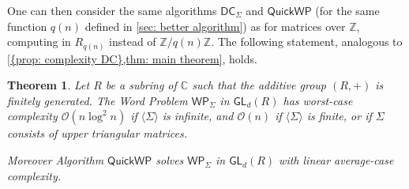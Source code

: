 \documentclass{article}
\def\O{\mathcal{O}}
\def\C{\mathbb{C}}
\def\Z{\mathbb{Z}}
\def\GL{\textsf{GL}}
\def\DC{\textsf{DC}}
\def\WP{\textsf{WP}}
\def\S{\textsf{QuickWP}}
\theoremstyle{plain}
\newtheorem{theorem}{Theorem}
\theoremstyle{definition}
\begin{document}
One can then consider the same algorithms $\DC_\Sigma$ and $\S$ (for the same function $q(n)$ defined in \cref{sec: better algorithm}) as for matrices over $\Z$, computing in $R_{q(n)}$ instead of $\Z/q(n)\Z$. The following statement, analogous to \cref{{prop: complexity DC},thm: main theorem}, holds.

\begin{theorem}\label{thm: main for integer rings}
    Let $R$ be a subring of $\C$ such that the additive group $(R,+)$ is finitely generated. The Word Problem $\WP_\Sigma$ in $\GL_d(R)$ has worst-case complexity $\O(n\log^2n)$ if $\langle\Sigma\rangle$ is infinite, and $\O(n)$ if $\langle\Sigma\rangle$ is finite, or if $\Sigma$ consists of upper triangular matrices.
    
    Moreover Algorithm $\S$ solves $\WP_\Sigma$ in $\GL_d(R)$ with linear average-case complexity.
\end{theorem}
\end{document}
